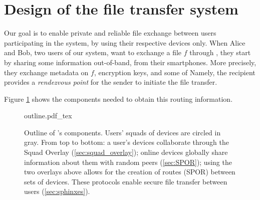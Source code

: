 
\section{Design of the \name file transfer system}%
\label{design}


Our goal is to enable private and reliable file exchange between users 
participating in the system, by using their respective devices only.
When Alice and Bob, two users of our system, want to exchange a file \(f\) 
through \name, they start by sharing some information out-of-band, \eg from 
their smartphones.
More precisely, they exchange metadata on \(f\), encryption keys, and
some of
 Namely,
the recipient provides a \emph{rendezvous point} for the sender to
initiate the file transfer.

Figure \cref{fig:outline} shows the components needed to obtain this
routing information.  

\begin{figure}[t]
  \centering
  \def\svgwidth{0.8\columnwidth}
  {outline.pdf_tex}
  \caption{\label{fig:outline}%
    Outline of \name's components. Users' squads of devices are circled in gray. 
    From top to bottom: a user's devices collaborate through the Squad Overlay 
    (\cref{sec:squad_overlay}); online devices globally share information about 
    them with random peers (\cref{sec:SPOR}); using the two 
    overlays above allows for the creation of routes (\ac{SPOR}) between sets of devices. 
    These protocols enable secure file transfer between users 
    (\cref{sec:sphinxes}).}
\end{figure}

